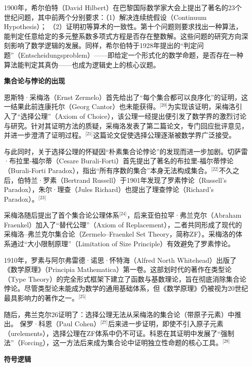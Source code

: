 1900年，希尔伯特（David Hilbert）在巴黎国际数学家大会上提出了著名的23个世纪问题，其中前两个分别要求：（1）解决连续统假设（Continuum Hypothesis）；  （2）证明初等算术的一致性。第十个问题则要求找出一种算法，能判定任意给定的多元整系数多项式方程是否存在整数解。这些问题的研究方向深刻影响了数学逻辑的发展。同样，希尔伯特于1928年提出的“判定问题”（Entscheidungsproblem）——即给定一个形式化的数学命题，是否存在一种算法能判定其真伪——也成为逻辑史上的核心议题。

\textbf{集合论与悖论的出现}

恩斯特·采梅洛（Ernst Zermelo）首先给出了“每个集合都可以良序化”的证明，这一结果此前连康托尔（Georg Cantor）也未能获得。\(^\text{[20]}\)为实现该证明，采梅洛引入了“选择公理”（Axiom of Choice），该公理一经提出便引发了数学界的激烈讨论与研究。针对其证明方法的质疑，采梅洛发表了第二篇论文，专门回应批评意见，并进一步澄清了证明过程。\(^\text{[21]}\)这篇论文促使选择公理逐渐被数学界广泛接受。

与此同时，关于选择公理的怀疑因“朴素集合论悖论”的发现而进一步加剧。切萨雷·布拉里-福尔蒂（Cesare Burali-Forti）首先提出了著名的布拉里-福尔蒂悖论（Burali-Forti Paradox），指出“所有序数的集合”本身无法构成集合。\(^\text{[22]}\)不久之后，伯特兰·罗素（Bertrand Russell）于1901年发现了罗素悖论（Russell’s Paradox），朱尔·理查（Jules Richard）也提出了理查悖论（Richard’s Paradox）。\(^\text{[23]}\)

采梅洛随后提出了首个集合论公理体系\(^\text{[24]}\)，后来亚伯拉罕·弗兰克尔（Abraham Fraenkel）加入了“替代公理”（Axiom of Replacement），二者共同形成了现代的采梅洛–弗兰克尔集合论（Zermelo–Fraenkel Set Theory，简称ZF）。采梅洛的体系通过“大小限制原理”（Limitation of Size Principle）有效避免了罗素悖论。

1910年，罗素与阿尔弗雷德·诺思·怀特海（Alfred North Whitehead）出版了《数学原理》（Principia Mathematica）第一卷。这部划时代的著作在类型论（Type Theory）的完全形式框架下建立了函数与基数理论，旨在彻底消除集合论悖论。尽管类型论未能成为数学的通用基础体系，但《数学原理》仍被视为20世纪最具影响力的著作之一。\(^\text{[25]}\)

随后，弗兰克尔26证明了：选择公理无法从采梅洛的集合论（带原子元素）中推出。  
保罗·科恩（Paul Cohen）\(^\text{[27]}\)后来进一步证明，即使不引入原子元素（urelements），选择公理在ZF体系中仍不可证。科恩在其证明中发展了“强制法”（Forcing），这一方法后来成为集合论中证明独立性命题的核心工具。\(^\text{[28]}\)

\textbf{符号逻辑}

